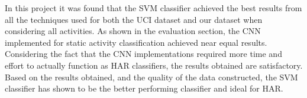 In this project it was found that the SVM classifier achieved the best results from all the techniques used for both the UCI dataset and our dataset when considering all activities.
As shown in the evaluation section, the CNN implemented for static activity classification achieved near equal results.
Considering the fact that the CNN implementations required more time and effort to actually function as HAR classifiers, the results obtained are satisfactory.
Based on the results obtained, and the quality of the data constructed, the SVM classifier has shown to be the better performing classifier and ideal for HAR.